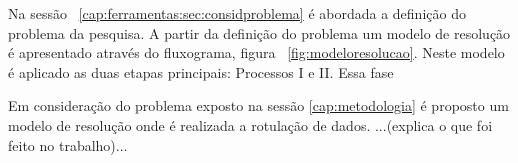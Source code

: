Na sessão ~\ref{cap:ferramentas:sec:considproblema} é abordada a definição do problema da pesquisa. A partir da definição do problema um modelo de resolução é apresentado através do fluxograma, figura ~\ref{fig:modeloresolucao}. Neste modelo é aplicado as duas etapas principais: Processos I e II. Essa fase

Em consideração do problema exposto na sessão \ref{cap:metodologia} é proposto um modelo de resolução onde é realizada a rotulação de dados. 
...(explica o que foi feito no trabalho)...



